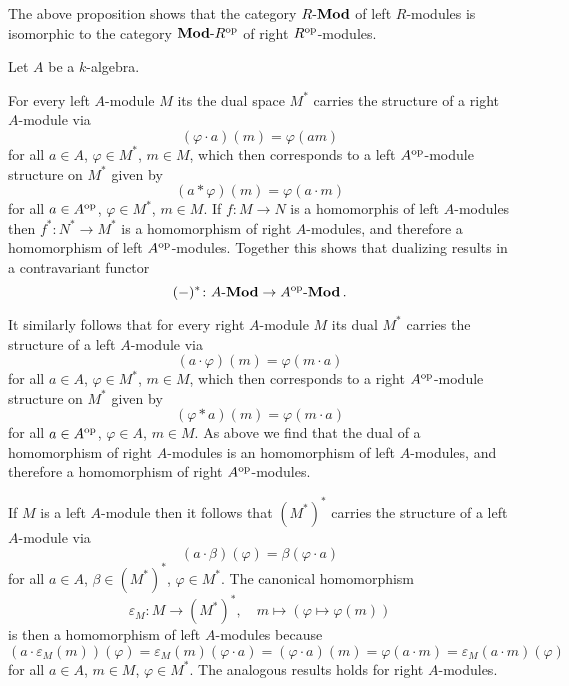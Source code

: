 \begin{remark}
  The above proposition shows that the category $R\text{-}\mathbf{Mod}$ of left $R$-modules is isomorphic to the category $\mathbf{Mod}\text{-}R^{\mathrm{op}}$ of right $R^{\mathrm{op}}$-modules.
\end{remark}


\begin{example}
  Let $A$ be a $k$-algebra.
  
  For every left $A$-module $M$ its the dual space $M^*$ carries the structure of a right $A$-module via
  \[
      (\varphi \cdot a)(m)
    = \varphi(am)
  \]
  for all $a \in A$, $\varphi \in M^*$, $m \in M$, which then corresponds to a left $A^{\mathrm{op}}$-module structure on $M^*$ given by
  \[
    (a * \varphi)(m)
    = \varphi(a \cdot m)
  \]
  for all $a \in A^{\mathrm{op}}$, $\varphi \in M^*$, $m \in M$.
  If $f \colon M \to N$ is a homomorphis of left $A$-modules then $f^* \colon N^* \to M^*$ is a homomorphism of right $A$-modules, and therefore a homomorphism of left $A^{\mathrm{op}}$-modules.
  Together this shows that dualizing results in a contravariant functor
  \[
            (-)^*
    \colon  A\text{-}\mathbf{Mod}
    \to     A^{\mathrm{op}}\text{-}\mathbf{Mod} \,.
  \]
  
  It similarly follows that for every right $A$-module $M$ its dual $M^*$ carries the structure of a left $A$-module via
  \[
      (a \cdot \varphi)(m)
    = \varphi(m \cdot a)
  \]
  for all $a \in A$, $\varphi \in M^*$, $m \in M$, which then corresponds to a right $A^{\mathrm{op}}$-module structure on $M^*$ given by
  \[
      (\varphi * a)(m)
    = \varphi(m \cdot a)
  \]
  for all $a \in A^{\mathrm{op}}$, $\varphi \in A$, $m \in M$.
  As above we find that the dual of a homomorphism of right $A$-modules is an homomorphism of left $A$-modules, and therefore a homomorphism of right $A^{\mathrm{op}}$-modules.
  
  If $M$ is a left $A$-module then it follows that $(M^*)^*$ carries the structure of a left $A$-module via
  \[
      (a \cdot \beta)(\varphi)
    = \beta(\varphi \cdot a)
  \]
  for all $a \in A$, $\beta \in (M^*)^*$, $\varphi \in M^*$.
  The canonical homomorphism
  \[
            \varepsilon_M
    \colon  M
    \to     (M^*)^*,
    \quad   m
    \mapsto (\varphi \mapsto \varphi(m))
  \]
  is then a homomorphism of left $A$-modules because
  \[
      (a \cdot \varepsilon_M(m))(\varphi)
    = \varepsilon_M(m)(\varphi \cdot a)
    = (\varphi \cdot a)(m)
    = \varphi(a \cdot m)
    = \varepsilon_M(a \cdot m)(\varphi)
  \]
  for all $a \in A$, $m \in M$, $\varphi \in M^*$.
  The analogous results holds for right $A$-modules.


\end{example}
